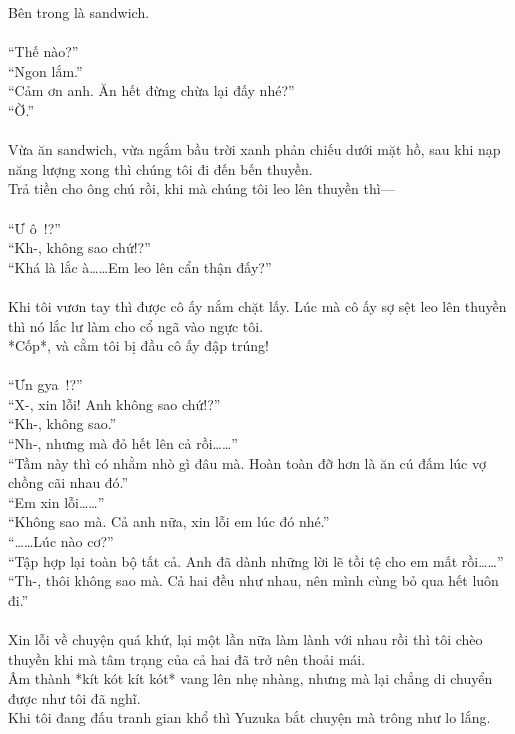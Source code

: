 \documentclass[12pt,a4paper, twosides]{book}
\begin{document}
Bên trong là sandwich.\\
\\
“Thế nào?”\\
“Ngon lắm.”\\
“Cảm ơn anh. Ăn hết đừng chừa lại đấy nhé?”\\
“Ờ.”\\
\\
Vừa ăn sandwich, vừa ngắm bầu trời xanh phản chiếu dưới mặt hồ, sau khi nạp năng lượng xong thì chúng tôi đi đến bến thuyền.\\
Trả tiền cho ông chú rồi, khi mà chúng tôi leo lên thuyền thì—\\
\\
“Ư ô~!?”\\
“Kh-, không sao chứ!?”\\
“Khá là lắc à……Em leo lên cẩn thận đấy?”\\
\\
Khi tôi vươn tay thì được cô ấy nắm chặt lấy. Lúc mà cô ấy sợ sệt leo lên thuyền thì nó lắc lư làm cho cổ ngã vào ngực tôi.\\
*Cốp*, và cằm tôi bị đầu cô ấy đập trúng!\\
\\
“Ưn gya~!?”\\
“X-, xin lỗi! Anh không sao chứ!?”\\
“Kh-, không sao.”\\
“Nh-, nhưng mà đỏ hết lên cả rồi……”\\
“Tầm này thì có nhằm nhò gì đâu mà. Hoàn toàn đỡ hơn là ăn cú đấm lúc vợ chồng cãi nhau đó.”\\
“Em xin lỗi……”\\
“Không sao mà. Cả anh nữa, xin lỗi em lúc đó nhé.”\\
“……Lúc nào cơ?”\\
“Tập hợp lại toàn bộ tất cả. Anh đã dành những lời lẽ tồi tệ cho em mất rồi……”\\
“Th-, thôi không sao mà. Cả hai đều như nhau, nên mình cùng bỏ qua hết luôn đi.”\\
\\
Xin lỗi về chuyện quá khứ, lại một lần nữa làm lành với nhau rồi thì tôi chèo thuyền khi mà tâm trạng của cả hai đã trở nên thoải mái.\\
Âm thành *kít kót kít kót* vang lên nhẹ nhàng, nhưng mà lại chẳng di chuyển được như tôi đã nghĩ.\\
Khi tôi đang đấu tranh gian khổ thì Yuzuka bắt chuyện mà trông như lo lắng.\\
\\
\end{document}
